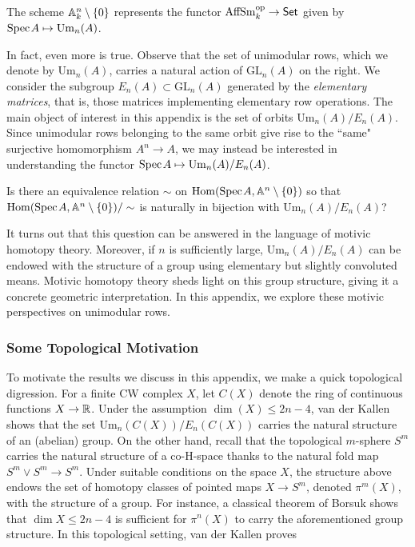  \begin{proposition}\label{prop:unimodular-basic}
     The scheme $\mathbb{A}^n_k\setminus\{0\}$ represents the  functor $\operatorname{AffSm}^{\mathrm{op}}_k \to \mathsf{Set}$ given by $\text{Spec}\hspace{0.1em} A \mapsto \operatorname{Um}_{n}(A)$. 
 \end{proposition}

In fact, even more is true. Observe that the set of unimodular rows, which we denote by $\mathrm{Um}_n(A)$, carries a natural action of $\mathrm{GL}_n(A)$ on the right. We consider the subgroup $E_n(A) \subset \mathrm{GL}_n(A)$ generated by the \textit{elementary matrices}, that is, those matrices implementing elementary row operations. The main object of interest in this appendix is the set of orbits $\mathrm{Um}_n(A)/E_n(A)$. Since unimodular rows belonging to the same orbit give rise to the ``same" surjective homomorphism $A^n \to A$, we may instead be interested in understanding the functor $\text{Spec}\hspace{0.1em} A \mapsto \mathrm{Um}_n(A)/E_n(A)$. 

\begin{question}\label{question:q1}
    Is there an equivalence relation $\sim$ on $\mathrm{Hom}(\text{Spec}\hspace{0.1em} A,\mathbb{A}^n\setminus\{0\})$ so that $\mathrm{Hom}(\text{Spec}\hspace{0.1em} A,\mathbb{A}^n\setminus\{0\})/\sim$ is naturally in bijection with $\mathrm{Um}_n(A)/E_n(A)$?
\end{question}

It turns out that this question can be answered in the language of motivic homotopy theory. Moreover, if $n$ is sufficiently large, $\mathrm{Um}_n(A)/E_n(A)$ can be endowed with the structure of a group using elementary but slightly convoluted means. Motivic homotopy theory sheds light on this group structure, giving it a concrete geometric interpretation. In this appendix, we explore these motivic perspectives on unimodular rows. 

\subsubsection{Some Topological Motivation}

To motivate the results we discuss in this appendix, we make a quick topological digression. For a finite CW complex $X$, let $C(X)$ denote the ring of continuous functions $X \to \mathbb{R}$. Under the assumption $\dim(X) \leq 2n - 4$, van der Kallen shows that the set $\mathrm{Um}_n(C(X))/E_n(C(X))$ carries the natural structure of an (abelian) group. On the other hand, recall that the topological $m$-sphere $S^m$ carries the natural structure of a co-H-space thanks to the natural fold map $S^m \vee S^m \to S^m$. Under suitable conditions on the space $X$, the structure above endows the set of homotopy classes of pointed maps $X \to S^m$, denoted $\pi^m(X)$, with the structure of a group. For instance, a classical theorem of Borsuk \cite{Borsuk61} shows that $\dim X \leq 2n - 4$ is sufficient for $\pi^n(X)$ to carry the aforementioned group structure. In this topological setting, van der Kallen \cite[Theorem 7.7]{vdk} proves

